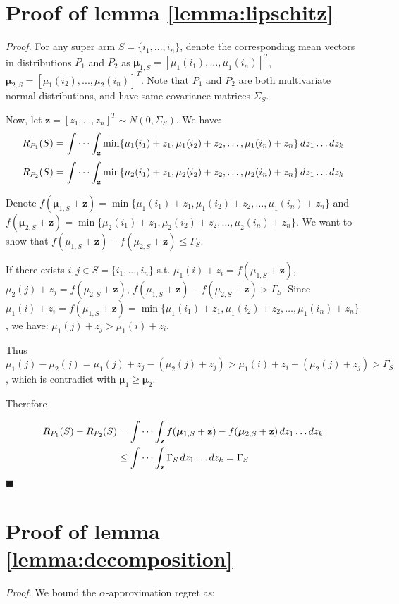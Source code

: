 \documentclass[opre,sglanonrev]{informs4}
\begin{document}
\section{Proof of lemma \ref{lemma:lipschitz}}
\textit{Proof.} For any super arm $S = \{i_1,...,i_n\}$, denote the corresponding mean vectors in distributions $P_1$ and $P_2$ as $\boldsymbol{\mu}_{1,S} = [\mu_1(i_1),...,\mu_1(i_n)]^T$, $\boldsymbol{\mu}_{2,S} = [\mu_1(i_2),...,\mu_2(i_n)]^T$. Note that $P_1$ and $P_2$ are both multivariate normal distributions, and have same covariance matrices $\Sigma_S$.

Now, let $\mathbf{z} = [z_1,...,z_n]^T \sim N(0,\Sigma_S)$. We have:
$$
R_{P_1}(S) = \idotsint_\mathbf{z} \min \{\mu_1(i_1)+z_1,\mu_1(i_2)+z_2, \dots ,\mu_1(i_n)+z_n\} \,dz_1 \dots dz_k
$$
$$
R_{P_2}(S) = \idotsint_\mathbf{z} \min \{\mu_2(i_1)+z_1,\mu_2(i_2)+z_2, \dots ,\mu_2(i_n)+z_n\} \,dz_1 \dots dz_k
$$

Denote $f(\boldsymbol{\mu}_{1,S}+\mathbf{z}) = \min \{\mu_1(i_1)+z_1,\mu_1(i_2)+z_2, \dots ,\mu_1(i_n)+z_n\}$ and $f(\boldsymbol{\mu}_{2,S}+\mathbf{z}) = \min \{\mu_2(i_1)+z_1,\mu_2(i_2)+z_2, \dots ,\mu_2(i_n)+z_n\}$. We want to show that $f(\mu_{1,S}+\mathbf{z})-f(\mu_{2,S}+\mathbf{z})\leq \Gamma_S$.

If there exists $i,j\in S=\{i_1,...,i_n\}$ s.t. $\mu_1(i)+z_i = f(\mu_{1,S}+\mathbf{z})$, $\mu_2(j)+z_j = f(\mu_{2,S}+\mathbf{z})$, $f(\mu_{1,S}+\mathbf{z})-f(\mu_{2,S}+\mathbf{z})>\Gamma_S$. Since $\mu_1(i)+z_i = f(\mu_{1,S}+\mathbf{z}) = \min \{\mu_1(i_1)+z_1,\mu_1(i_2)+z_2, \dots ,\mu_1(i_n)+z_n\}$, we have: $\mu_1(j)+z_j> \mu_1(i)+z_i$.

Thus $\mu_1(j)-\mu_2(j) = \mu_1(j)+z_j-(\mu_2(j)+z_j)>\mu_1(i)+z_i-(\mu_2(j)+z_j)>\Gamma_S$, which is contradict with $\boldsymbol{\mu}_1 \geq \boldsymbol{\mu}_2$.

Therefore

$$
\begin{aligned}
R_{P_1}(S)-R_{P_2}(S) &= \idotsint_\mathbf{z} f(\boldsymbol{\mu}_{1,S}+\mathbf{z})-f(\boldsymbol{\mu}_{2,S}+\mathbf{z}) \,dz_1 \dots dz_k\\
&\leq \idotsint_\mathbf{z} \Gamma_S \,dz_1 \dots dz_k = \Gamma_S 
\end{aligned}
$$
\hfill $\blacksquare$

\section{Proof of lemma \ref{lemma:decomposition}}
\textit{Proof.} 
We bound the $\alpha$-approximation regret as:
\end{document}
